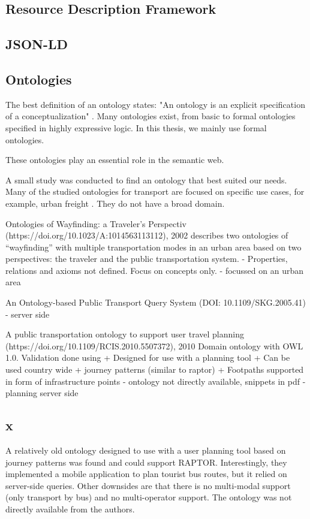 \subsection{Resource Description Framework}
\subsection{JSON-LD}

\subsection{Ontologies}
The best definition of an ontology states: "An ontology is an explicit specification of a conceptualization" \cite{gruber_translation_1993}. Many ontologies exist, from basic to formal ontologies specified in highly expressive logic. In this thesis, we mainly use formal ontologies.

These ontologies play an essential role in the semantic web. 

A small study was conducted to find an ontology that best suited our needs. Many of the studied ontologies for transport are focused on specific use cases, for example, urban freight \cite{bouhana_ontology-based_2015}. They do not have a broad domain. 

Ontologies of Wayfinding: a Traveler’s Perspectiv (https://doi.org/10.1023/A:1014563113112), 2002
describes two ontologies of “wayfinding” with multiple transportation modes in an urban area based on two perspectives: the traveler and the public transportation system.
- Properties, relations and axioms not defined. Focus on concepts only.
- focussed on an urban area

An Ontology-based Public Transport Query System (DOI: 10.1109/SKG.2005.41)
- server side 

 A public transportation ontology to support user travel planning (https://doi.org/10.1109/RCIS.2010.5507372), 2010
Domain ontology with OWL 1.0. Validation done using 
+ Designed for use with a planning tool
+ Can be used country wide
+ journey patterns (similar to raptor)
+ Footpaths supported in form of infrastructure points
- ontology not directly available, snippets in pdf
- planning server side

\subsection{x}
A relatively old ontology designed to use with a user planning tool based on journey patterns \cite{5507372} was found and could support RAPTOR. Interestingly, they implemented a mobile application to plan tourist bus routes, but it relied on server-side queries. Other downsides are that there is no multi-modal support (only transport by bus) and no multi-operator support. The ontology was not directly available from the authors.

